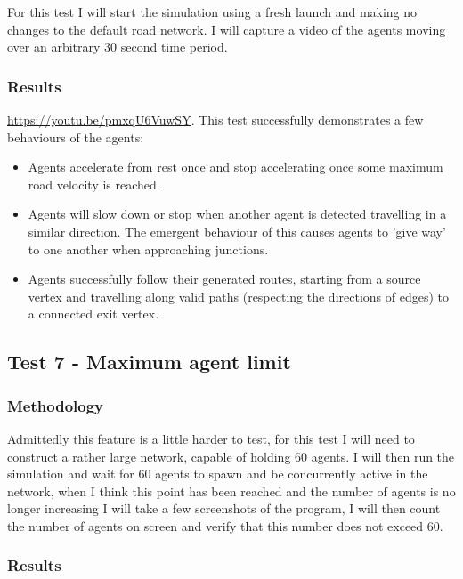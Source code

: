             For this test I will start the simulation using a fresh launch and making no changes to the default road network. I will capture a video of the agents moving over an arbitrary 30 second time period.

        \subsubsection{Results}

            \href{https://youtu.be/pmxqU6VuwSY}{https://youtu.be/pmxqU6VuwSY}. This test successfully demonstrates a few behaviours of the agents:

            \begin{itemize}
                \item Agents accelerate from rest once and stop accelerating once some maximum road velocity is reached.
                \item Agents will slow down or stop when another agent is detected travelling in a similar direction. The emergent behaviour of this causes agents to 'give way' to one another when approaching junctions.
                \item Agents successfully follow their generated routes, starting from a source vertex and travelling along valid paths (respecting the directions of edges) to a connected exit vertex.
            \end{itemize}

    \subsection{Test 7 - Maximum agent limit}
    \label{testing:t7}

        \subsubsection{Methodology}

            Admittedly this feature is a little harder to test, for this test I will need to construct a rather large network, capable of holding 60 agents. I will then run the simulation and wait for 60 agents to spawn and be concurrently active in the network, when I think this point has been reached and the number of agents is no longer increasing I will take a few screenshots of the program, I will then count the number of agents on screen and verify that this number does not exceed 60.

        \subsubsection{Results}

